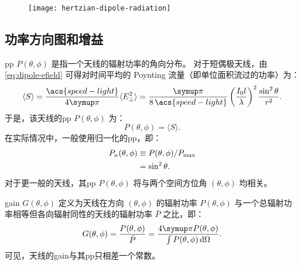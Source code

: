 \begin{figure}[htp]
  \centering
  \texttt{[image: hertzian-dipole-radiation]}
  \label{fig:dipole-radiation}
\end{figure}

\subsection{功率方向图和增益}

\acf{pp} $P(\theta,\phi)$ 是指一个天线的辐射功率的角向分布。
对于短偶极天线，由\autoref{eq:dipole-efield} 可得对时间平均的
Poynting 流量（即单位面积流过的功率）为：
\begin{equation}
  \label{eq:poynting-flux}
  \langle S \rangle
    = \frac{\acs{speed-light}}{4\Cpi} \langle E_{\perp}^2 \rangle
    = \frac{\Cpi}{8\,\acs{speed-light}}
      \left( \frac{I_0 l}{\lambda} \right)^2 \frac{\sin^2\theta}{r^2} .
\end{equation}
于是，该天线的\ac{pp} $P(\theta,\phi)$ 为：
\begin{equation}
  P(\theta,\phi) = \langle S \rangle.
\end{equation}
在实际情况中，一般使用归一化的\ac{pp}，即：
\begin{align}
  \label{eq:power-pattern}
  P_n(\theta,\phi)
    & \equiv P(\theta,\phi) / P_{\mathrm{max}} \\
    & = \sin^2\theta .
\end{align}
对于更一般的天线，其\ac{pp} $P(\theta,\phi)$
将与两个空间方位角 $(\theta, \phi)$ 均相关。

\acf{gain} $G(\theta,\phi)$ 定义为天线在方向 $(\theta, \phi)$
的辐射功率 $P(\theta,\phi)$ 与一个总辐射功率相等但各向辐射同性的天线的辐射功率
$\bar{P}$ 之比，即：
\begin{equation}
  \label{eq:gain}
  G(\theta,\phi) = \frac{P(\theta,\phi)}{\bar{P}}
    = \frac{4\Cpi P(\theta,\phi)}{\int P(\theta,\phi) \,\D{\Omega}} .
\end{equation}
可见，天线的\ac{gain}与其\ac{pp}只相差一个常数。

